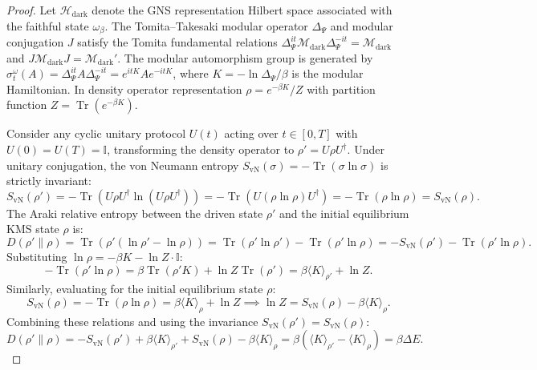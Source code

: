 \documentclass[11pt,onecolumn]{article}
\DeclareMathOperator{\Tr}{Tr}
\begin{document}
\begin{proof}
Let $\mathcal{H}_{\text{dark}}$ denote the GNS representation Hilbert space associated with the faithful state $\omega_\beta$. The Tomita--Takesaki modular operator $\Delta_\Psi$ and modular conjugation $J$ satisfy the Tomita fundamental relations $\Delta_\Psi^{it} \mathcal{M}_{\text{dark}} \Delta_\Psi^{-it} = \mathcal{M}_{\text{dark}}$ and $J \mathcal{M}_{\text{dark}} J = \mathcal{M}_{\text{dark}}'$. The modular automorphism group is generated by $\sigma_t^{\omega}(A) = \Delta_\Psi^{it} A \Delta_\Psi^{-it} = e^{i t K} A e^{-i t K}$, where $K = -\ln\Delta_\Psi / \beta$ is the modular Hamiltonian. In density operator representation $\rho = e^{-\beta K}/Z$ with partition function $Z = \Tr(e^{-\beta K})$.

Consider any cyclic unitary protocol $U(t)$ acting over $t \in [0, T]$ with $U(0) = U(T) = \mathbb{I}$, transforming the density operator to $\rho' = U \rho U^\dagger$. Under unitary conjugation, the von Neumann entropy $S_{\text{vN}}(\sigma) = -\Tr(\sigma\ln\sigma)$ is strictly invariant:
\begin{equation}
S_{\text{vN}}(\rho') = -\Tr(U\rho U^\dagger \ln(U\rho U^\dagger)) = -\Tr(U (\rho\ln\rho) U^\dagger) = -\Tr(\rho\ln\rho) = S_{\text{vN}}(\rho).
\end{equation}
The Araki relative entropy between the driven state $\rho'$ and the initial equilibrium KMS state $\rho$ is:
\begin{equation}
D(\rho' \parallel \rho) = \Tr(\rho'(\ln\rho' - \ln\rho)) = \Tr(\rho'\ln\rho') - \Tr(\rho'\ln\rho) = -S_{\text{vN}}(\rho') - \Tr(\rho'\ln\rho).
\end{equation}
Substituting $\ln\rho = -\beta K - \ln Z \cdot \mathbb{I}$:
\begin{equation}
-\Tr(\rho'\ln\rho) = \beta \Tr(\rho' K) + \ln Z \Tr(\rho') = \beta \langle K \rangle_{\rho'} + \ln Z.
\end{equation}
Similarly, evaluating for the initial equilibrium state $\rho$:
\begin{equation}
S_{\text{vN}}(\rho) = - \Tr(\rho\ln\rho) = \beta \langle K \rangle_\rho + \ln Z \implies \ln Z = S_{\text{vN}}(\rho) - \beta \langle K \rangle_\rho.
\end{equation}
Combining these relations and using the invariance $S_{\text{vN}}(\rho') = S_{\text{vN}}(\rho)$:
\begin{equation}
D(\rho' \parallel \rho) = -S_{\text{vN}}(\rho') + \beta \langle K \rangle_{\rho'} + S_{\text{vN}}(\rho) - \beta \langle K \rangle_\rho = \beta \left( \langle K \rangle_{\rho'} - \langle K \rangle_\rho \right) = \beta \Delta E.

\end{equation}
\end{proof}
\end{document}
